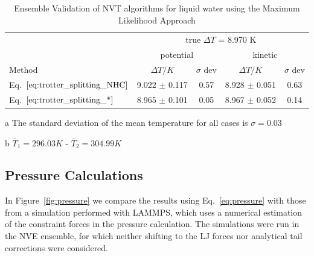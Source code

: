 \documentclass[aip,jcp,reprint,amsmath,amssymb,raggedbottom]{revtex4-1}
\begin{document}
\begingroup
\squeezetable
\begin{table}
\setlength{\tabcolsep}{7pt}
\begin{threeparttable}
\caption{Ensemble Validation of NVT algorithms for liquid water using the Maximum Likelihood Approach  }
\label{table:ensemblevalidation}
\centering %
\begin{tabular}{|l c  c  c  c |}  
\hline
 & \multicolumn{4}{c|}{true $\Delta T$ = 8.970 K}\\
\cline{2-5}
  & \multicolumn{2}{c}{potential} & \multicolumn{2}{c|}{kinetic}\\
\hline
Method  &$\Delta T/K$ &$\sigma$ dev &$\Delta T/K$&$\sigma$ dev\\
\hline %
 Eq.~$\ref{eq:trotter_splitting_NHC}$   & 9.022 $\pm$ 0.117 & 0.57 & 8.928 $\pm$ 0.051 & 0.63 \\
 Eq.~$\ref{eq:trotter_splitting_*}$   & 8.965 $\pm$ 0.101 & 0.05 & 8.967 $\pm$ 0.052 & 0.14\\
  \hline
\end{tabular}
\begin{tablenotes}
\item[a] The standard deviation of the mean temperature for all cases is $\sigma = 0.03$
\item[b]$\bar{T}_1 = 296.03 K $  - $\bar{T}_2 = 304.99 K$
\end{tablenotes}
\end{threeparttable}
\end{table}
\endgroup

\subsection{Pressure Calculations}

In Figure~\ref{fig:pressure} we compare the results using Eq.~\ref{eq:pressure} with those from a simulation performed with LAMMPS, which uses a numerical estimation of the constraint forces in the pressure calculation. The simulations were run in the NVE ensemble, for which neither shifting to the LJ forces nor analytical tail corrections were considered. 

\end{document}
